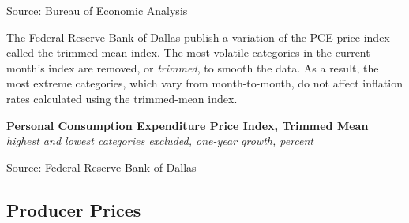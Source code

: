 \documentclass{report}
\makeatletter
\newcommand{\tbllink}[1]{\href{https://raw.githubusercontent.com/bdecon/US-chartbook/master/chartbook/data/#1}{\faTable}}
\newcommand*\short[1]{\expandafter\@gobbletwo\number\numexpr#1\relax}
\newcommand{\dateaxisticks}{
		date coordinates in=x, axis line style={draw=none},
		xmax={2022-10-31},
		max space between ticks=40,	    
		xtick={{1990-01-01}, {1992-01-01}, {1994-01-01}, 
			{1996-01-01}, {1998-01-01}, {2000-01-01}, 
			{2002-01-01}, {2004-01-01}, {2006-01-01},
			{2008-01-01}, {2010-01-01}, {2012-01-01}, {2014-01-01},
		    {2016-01-01}, {2018-01-01}, {2020-01-01}, {2022-01-01}, 
		    {2024-01-01}, {2026-01-01}},
		minor xtick={{1989-01-01}, {1991-01-01}, {1993-01-01},
			{1995-01-01}, {1997-01-01}, {1999-01-01}, 
			{2001-01-01}, {2003-01-01}, {2005-01-01}, {2007-01-01},
		    {2009-01-01}, {2011-01-01}, {2013-01-01}, {2015-01-01},
		    {2017-01-01}, {2019-01-01}, {2021-01-01}, {2023-01-01}, 
		    {2025-01-01}, {2027-01-01}},
		enlarge y limits={0.06}, enlarge x limits={0.01},
		}
\newcommand{\bbar}[2]{extra #1 ticks = {{#2}}, extra #1 tick labels = ,
		extra #1 tick style = {grid=major, grid style={thick, black!25}},}
\newcommand{\stdline}[4]{\addplot[very thick, no markers, color=#1] 
		table [x=#2, y=#3, col sep=comma] {#4};	}
\newcommand{\rbars}{
		\fill[color=black!10] (axis cs:{1990-07-01},\pgfkeysvalueof{/pgfplots/ymin}) rectangle 
			(axis cs:{1991-03-01}, \pgfkeysvalueof{/pgfplots/ymax});
		\fill[color=black!10] (axis cs:{2007-12-01},\pgfkeysvalueof{/pgfplots/ymin}) rectangle 
			(axis cs:{2009-07-01}, \pgfkeysvalueof{/pgfplots/ymax});
		\fill[color=black!10] (axis cs:{2001-03-01},\pgfkeysvalueof{/pgfplots/ymin}) rectangle 
			(axis cs:{2001-11-01}, \pgfkeysvalueof{/pgfplots/ymax});
		\fill[color=black!10] (axis cs:{2020-02-01},\pgfkeysvalueof{/pgfplots/ymin}) rectangle 
			(axis cs:{2020-05-01}, \pgfkeysvalueof{/pgfplots/ymax});}
\makeatother
\begin{document}
{\begin{minipage}{0.76\textwidth}
\hspace{3mm} 

\footnotesize{Source: Bureau of Economic Analysis} \hfill \tbllink{pce_pi.csv}
\vspace{5mm}

\small The Federal Reserve Bank of Dallas \href{https://www.dallasfed.org/research/pce}{publish} a variation of the PCE price index called the trimmed-mean index. The most volatile categories in the current month's index are removed, or \textit{trimmed}, to smooth the data. As a result, the most extreme categories, which vary from month-to-month, do not affect inflation rates calculated using the trimmed-mean index. 


\vspace{1mm}

\normalsize \textbf{Personal Consumption Expenditure Price Index, Trimmed Mean}\\
\footnotesize{\textit{highest and lowest categories excluded, one-year growth, percent}}\\
\vspace{26mm}

\hspace{3mm} 

\footnotesize{Source: Federal Reserve Bank of Dallas} \hfill \tbllink{pce_tm12.csv}
\end{minipage} 
\newpage
\begin{minipage}{0.76\textwidth}
\hypertarget{prp}{}
\subsection*{Producer Prices}


\end{minipage}}
\end{document}

